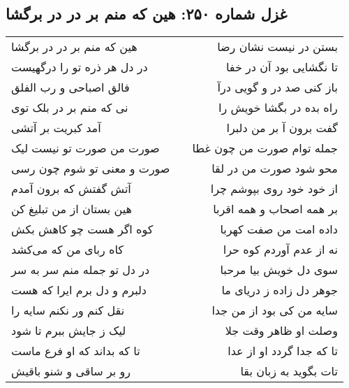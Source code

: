 \begin{center}
\section*{غزل شماره ۲۵۰: هین که منم بر در در برگشا}
\label{sec:0250}
\begin{longtable}{l p{0.5cm} r}
هین که منم بر در در برگشا
&&
بستن در نیست نشان رضا
\\
در دل هر ذره تو را درگهیست
&&
تا نگشایی بود آن در خفا
\\
فالق اصباحی و رب الفلق
&&
باز کنی صد در و گویی درآ
\\
نی که منم بر در بلک توی
&&
راه بده در بگشا خویش را
\\
آمد کبریت بر آتشی
&&
گفت برون آ بر من دلبرا
\\
صورت من صورت تو نیست لیک
&&
جمله توام صورت من چون غطا
\\
صورت و معنی تو شوم چون رسی
&&
محو شود صورت من در لقا
\\
آتش گفتش که برون آمدم
&&
از خود خود روی بپوشم چرا
\\
هین بستان از من تبلیغ کن
&&
بر همه اصحاب و همه اقربا
\\
کوه اگر هست چو کاهش بکش
&&
داده امت من صفت کهربا
\\
کاه ربای من که می‌کشد
&&
نه از عدم آوردم کوه حرا
\\
در دل تو جمله منم سر به سر
&&
سوی دل خویش بیا مرحبا
\\
دلبرم و دل برم ایرا که هست
&&
جوهر دل زاده ز دریای ما
\\
نقل کنم ور نکنم سایه را
&&
سایه من کی بود از من جدا
\\
لیک ز جایش ببرم تا شود
&&
وصلت او ظاهر وقت جلا
\\
تا که بداند که او فرع ماست
&&
تا که جدا گردد او از عدا
\\
رو بر ساقی و شنو باقیش
&&
تات بگوید به زبان بقا
\\
\end{longtable}
\end{center}
